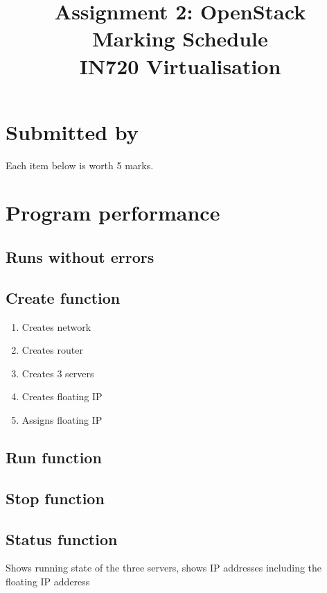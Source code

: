\documentclass{article}
\begin{document}
\title{Assignment 2: OpenStack \\ Marking Schedule\\IN720 Virtualisation}
\date{}
\maketitle

\section*{Submitted by}

 \vspace{20mm}
 
Each item below is worth 5 marks.
 
\section{Program performance}

\subsection{Runs without errors}
 \vspace{10mm}
 
\subsection{Create function}
  \begin{enumerate}
    \item Creates network
    \item Creates router
    \item Creates 3 servers
    \item Creates floating IP
    \item Assigns floating IP
  \end{enumerate}
 \vspace{10mm}
 
\subsection{Run function}

\subsection{Stop function}

\subsection{Status function}
  Shows running state of the three servers, shows IP addresses including the floating IP adderess
\end{document}

